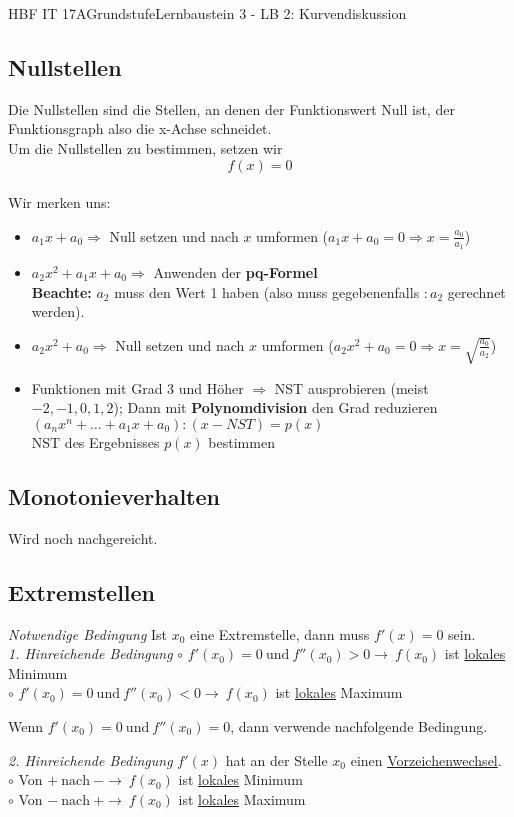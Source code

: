 \documentclass[11pt,twocolumn,oneside,openany,headings=optiontotoc,11pt,numbers=noenddot]{article}
\begin{document}
\begin{worksheet}{HBF IT 17A}{Grundstufe}{Lernbaustein 3 - LB 2: Kurvendiskussion}
		\subsection*{Nullstellen} Die Nullstellen sind die Stellen, an denen der Funktionswert Null ist, der Funktionsgraph also die x-Achse schneidet.\\
		Um die Nullstellen zu bestimmen, setzen wir \[f(x) = 0\]\\
		Wir merken uns:
		\begin{itemize}
			\item \(a_1x + a_0 \Rightarrow\) Null setzen und nach \(x\) umformen (\(a_1x + a_0 = 0 \Rightarrow x = \frac{a_0}{a_1}\))
			\item  \(a_2x^2 + a_1x + a_0 \Rightarrow\) Anwenden der \textbf{pq-Formel}\\
			\textbf{Beachte:} \(a_2\) muss den Wert 1 haben (also muss gegebenenfalls \(:a_2\) gerechnet werden).
			\item \(a_2x^2 + a_0 \Rightarrow\) Null setzen und nach \(x\) umformen (\(a_2x^2 + a_0 = 0 \Rightarrow x = \sqrt{\frac{a_0}{a_2}}\))
			\item Funktionen mit Grad 3 und Höher \(\Rightarrow\) NST ausprobieren (meist \(-2,-1,0,1,2\)); Dann mit \textbf{Polynomdivision} den Grad reduzieren\\
			\((a_nx^n + \ldots +a_1x +a_0):(x-NST) = p(x)\)\\
			NST des Ergebnisses \(p(x)\) bestimmen
		\end{itemize}
		\subsection*{Monotonieverhalten} \color{red}Wird noch nachgereicht.\normalcolor
		\subsection*{Extremstellen} \textit{Notwendige Bedingung} Ist \(x_0\) eine Extremstelle, dann muss \(f'(x) = 0\) sein.\\
		\textit{1. Hinreichende Bedingung} 
		\(\circ\) \(f'(x_0)=0\ \text{und}\ f''(x_0) > 0 \rightarrow\ f(x_0)\) ist \underline{lokales} Minimum\\
		\(\circ\) \(f'(x_0)=0\ \text{und}\ f''(x_0) < 0 \rightarrow\ f(x_0)\) ist \underline{lokales} Maximum\\
		\par\noindent
		Wenn \(f'(x_0)=0\ \text{und}\ f''(x_0)=0\), dann verwende nachfolgende Bedingung.\\
		\par\noindent
		\textit{2. Hinreichende Bedingung} \(f'(x)\) hat an der Stelle \(x_0\) einen \underline{Vorzeichenwechsel}.\\
		\(\circ\) Von \(+\ \text{nach}\ - \rightarrow\ f(x_0)\) ist \underline{lokales} Minimum\\
		\(\circ\) Von \(-\ \text{nach}\ + \rightarrow\ f(x_0)\) ist \underline{lokales} Maximum\\

\end{worksheet}
\end{document}

